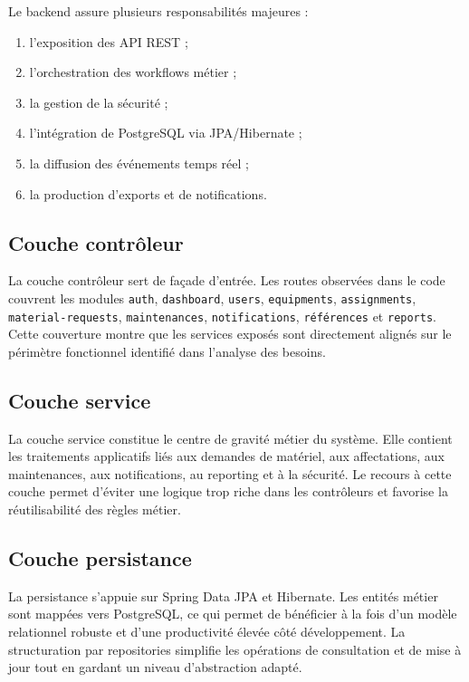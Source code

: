 Le backend assure plusieurs responsabilités majeures :
\begin{enumerate}
  \item l'exposition des API REST ;
  \item l'orchestration des workflows métier ;
  \item la gestion de la sécurité ;
  \item l'intégration de PostgreSQL via JPA/Hibernate ;
  \item la diffusion des événements temps réel ;
  \item la production d'exports et de notifications.
\end{enumerate}

\subsection{Couche contrôleur}
La couche contrôleur sert de façade d'entrée. Les routes observées dans le code couvrent les modules \texttt{auth}, \texttt{dashboard}, \texttt{users}, \texttt{equipments}, \texttt{assignments}, \texttt{material-requests}, \texttt{maintenances}, \texttt{notifications}, \texttt{références} et \texttt{reports}. Cette couverture montre que les services exposés sont directement alignés sur le périmètre fonctionnel identifié dans l'analyse des besoins.

\subsection{Couche service}
La couche service constitue le centre de gravité métier du système. Elle contient les traitements applicatifs liés aux demandes de matériel, aux affectations, aux maintenances, aux notifications, au reporting et à la sécurité. Le recours à cette couche permet d'éviter une logique trop riche dans les contrôleurs et favorise la réutilisabilité des règles métier.

\subsection{Couche persistance}
La persistance s'appuie sur Spring Data JPA et Hibernate. Les entités métier sont mappées vers PostgreSQL, ce qui permet de bénéficier à la fois d'un modèle relationnel robuste et d'une productivité élevée côté développement. La structuration par repositories simplifie les opérations de consultation et de mise à jour tout en gardant un niveau d'abstraction adapté.

